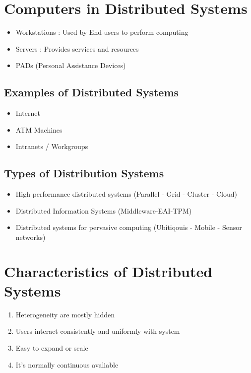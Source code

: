 \documentclass{article}
\begin{document}
\section{Computers in Distributed Systems}
\begin{itemize}
    \item Workstations : Used by End-users to perform computing
    \item Servers : Provides services and resources
    \item PADs (Personal Assistance Devices)
\end{itemize}

\subsection{Examples of Distributed Systems}
\begin{itemize}
    \item Internet
    \item ATM Machines
    \item Intranets / Workgroups
\end{itemize}

\subsection{Types of Distribution Systems}
\begin{itemize}
    \item High performance distributed systems (Parallel - Grid - Cluster - Cloud)
    \item Distributed Information Systems (Middleware-EAI-TPM)
    \item Distributed systems for pervasive computing (Ubitiqouis - Mobile - Sensor networks)

\end{itemize}

\section{Characteristics of Distributed Systems}
\begin{enumerate}
    \item Heterogeneity are mostly hidden
    \item Users interact consistently and uniformly with system
    \item Easy to expand or scale
    \item It's normally continuous avaliable
\end{enumerate}
\end{document}
